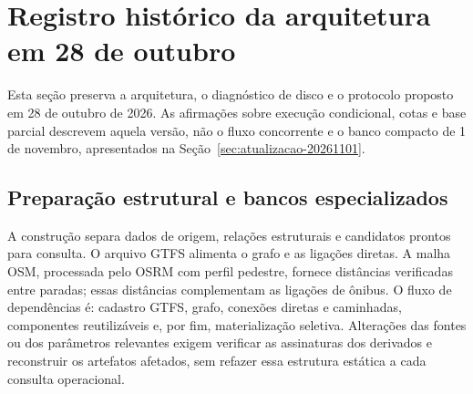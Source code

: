 \section{Registro histórico da arquitetura em 28 de outubro}\label{sec:historico-arquitetura}
Esta seção preserva a arquitetura, o diagnóstico de disco e o protocolo proposto em 28 de outubro de 2026. As afirmações sobre execução condicional, cotas e base parcial descrevem aquela versão, não o fluxo concorrente e o banco compacto de 1 de novembro, apresentados na Seção~\ref{sec:atualizacao-20261101}.

\subsection{Preparação estrutural e bancos especializados}
A construção separa dados de origem, relações estruturais e candidatos prontos para consulta. O arquivo GTFS alimenta o grafo e as ligações diretas. A malha OSM, processada pelo OSRM com perfil pedestre, fornece distâncias verificadas entre paradas; essas distâncias complementam as ligações de ônibus. O fluxo de dependências é: cadastro GTFS, grafo, conexões diretas e caminhadas, componentes reutilizáveis e, por fim, materialização seletiva. Alterações das fontes ou dos parâmetros relevantes exigem verificar as assinaturas dos derivados e reconstruir os artefatos afetados, sem refazer essa estrutura estática a cada consulta operacional.

